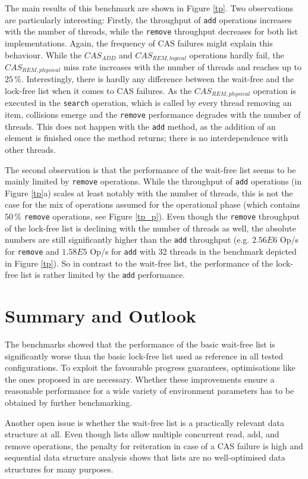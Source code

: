 \documentclass[a4paper, 12pt]{article}
\begin{document}
The main results of this benchmark are shown in Figure \ref{tp}. Two observations are particularly interesting: Firstly, the throughput of \verb|add| operations increases with the number of threads, while the \verb|remove| throughput decreases for both list implementations. Again, the frequency of CAS failures might explain this behaviour. While the $CAS_{ADD}$ and $CAS_{REM, logical}$ operations hardly fail, the $CAS_{REM, physical}$ miss rate increases with the number of threads and reaches up to $25\,\%$. Interestingly, there is hardly any difference between the wait-free and the lock-free list when it comes to CAS failures. As the $CAS_{REM, physical}$ operation is executed in the \verb|search| operation, which is called by every thread removing an item, collisions emerge and the \verb|remove| performance degrades with the number of threads. This does not happen with the \verb|add| method, as the addition of an element is finished once the method returns; there is no interdependence with other threads.

The second observation is that the performance of the wait-free list seems to be mainly limited by \verb|remove| operations. While the throughput of \verb|add| operations (in Figure \ref{tp}a) scales at least notably with the number of threads, this is not the case for the mix of operations assumed for the operational phase (which contains $50\,\%$ \verb|remove| operations, see Figure \ref{tp_p}). Even though the \verb|remove| throughput of the lock-free list is declining with the number of threads as well, the absolute numbers are still significantly higher than the \verb|add| throughput (e.g. $2.56E6$ Op/s for \verb|remove| and $1.58E5$ Op/s for \verb|add| with 32 threads in the benchmark depicted in Figure \ref{tp}). So in contrast to the wait-free list, the performance of the lock-free list is rather limited by the \verb|add| performance.

\section{Summary and Outlook}

The benchmarks showed that the performance of the basic wait-free list is significantly worse than the basic lock-free list used as reference in all tested configurations. To exploit the favourable progress guarantees, optimisations like the ones proposed in \cite{timnat12} are necessary. Whether these improvements ensure a reasonable performance for a wide variety of environment parameters has to be obtained by further benchmarking.

Another open issue is whether the wait-free list is a practically relevant data structure at all. Even though lists allow multiple concurrent read, add, and remove operations, the penalty for reiteration in case of a CAS failure is high and sequential data structure analysis shows that lists are no well-optimised data structures for many purposes.

\pagebreak
\sloppy
\printbibliography
\end{document}
